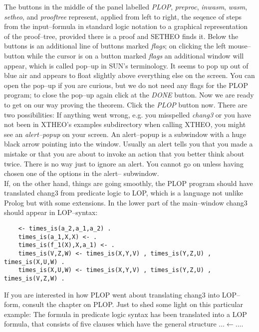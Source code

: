 The buttons in the middle of the panel labelled {\it PLOP\/}, {\it preproc\/}, {\it inwasm\/}, {\it wasm\/}, {\it setheo\/}, and
{\it prooftree\/} represent, applied from left to right, the seqence of steps from the 
input--formula in standard logic notation to a graphical representation of the proof--tree, provided 
there is a proof and SETHEO finds it. Below the buttons is an additional line of buttons
marked {\it flags\/}; on clicking the left mouse--button while the cursor is on a button marked {\it flags\/}
an additional window will appear, which is called pop--up in SUN's terminology.
It seems to pop up out of blue air and appears to float slightly above everything else
on the screen.
You can open the pop--up if you are curious, but we do not need any flags for the PLOP program;
to close the pop--up again click at the {\it DONE\/} button. 
Now we are ready to get on our way proving the theorem. Click the {\it PLOP\/} button now.
There are two possibilities:
If anything went wrong, e.g. you misspelled {\it chang3\/} or you have not been in XTHEO's examples
subdirectory when calling XTHEO, you might see an {\it alert--popup\/} on your screen. An alert--popup
is a subwindow with a huge black arrow pointing into the window. Usually an
alert tells you that you made a mistake or that you are about to invoke an action that you better think
about twice. There is no way just to ignore an alert. You cannot go on unless having chosen one of the
options in the alert-- subwindow. \\
If, on the other hand, things are going smoothly, the PLOP program should have translated chang3 from
predicate logic to LOP, which is a language not unlike Prolog but with some extensions.
In the lower part of the main--window chang3 should appear in LOP--syntax:
\begin{center}
\begin{verbatim}
    <- times_is(a_2,a_1,a_2) . 
    times_is(a_1,X,X) <- . 
    times_is(f_1(X),X,a_1) <- . 
    times_is(V,Z,W) <- times_is(X,Y,V) , times_is(Y,Z,U) , times_is(X,U,W) . 
    times_is(X,U,W) <- times_is(X,Y,V) , times_is(Y,Z,U) , times_is(V,Z,W) . 
\end{verbatim}
\end{center}
If you are interested in how PLOP went about translating chang3 into LOP--form, consult the chapter on PLOP.
Just to shed some light on this particular example:
The formula in predicate logic syntax has been translated into a LOP formula, that consists of
five clauses which have the general structure $\ldots \leftarrow \ldots .$
